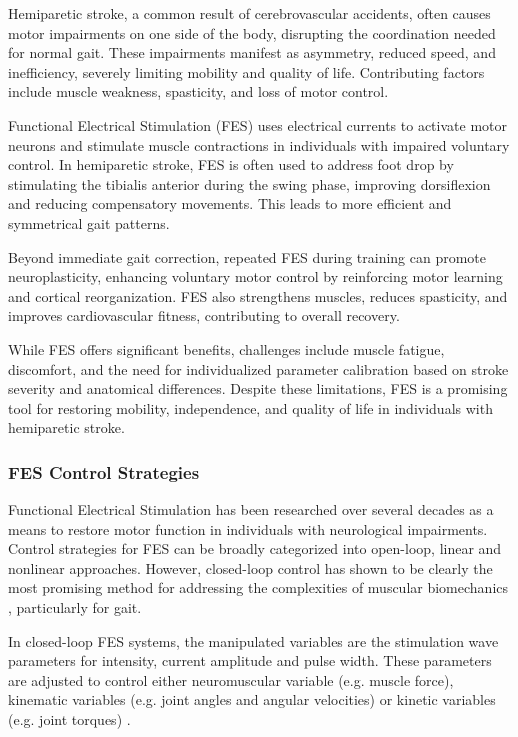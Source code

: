 Hemiparetic stroke, a common result of cerebrovascular accidents, often causes motor impairments on one side of the body, disrupting the coordination needed for normal gait. These impairments manifest as asymmetry, reduced speed, and inefficiency, severely limiting mobility and quality of life. Contributing factors include muscle weakness, spasticity, and loss of motor control.

Functional Electrical Stimulation (FES) uses electrical currents to activate motor neurons and stimulate muscle contractions in individuals with impaired voluntary control. In hemiparetic stroke, FES is often used to address foot drop by stimulating the tibialis anterior during the swing phase, improving dorsiflexion and reducing compensatory movements. This leads to more efficient and symmetrical gait patterns.

Beyond immediate gait correction, repeated FES during training can promote neuroplasticity, enhancing voluntary motor control by reinforcing motor learning and cortical reorganization. FES also strengthens muscles, reduces spasticity, and improves cardiovascular fitness, contributing to overall recovery.

While FES offers significant benefits, challenges include muscle fatigue, discomfort, and the need for individualized parameter calibration based on stroke severity and anatomical differences. Despite these limitations, FES is a promising tool for restoring mobility, independence, and quality of life in individuals with hemiparetic stroke.

\subsubsection*{FES Control Strategies}
Functional Electrical Stimulation has been researched over several decades as a means to restore motor function in individuals with neurological impairments. Control strategies for FES can be broadly categorized into open-loop, linear and nonlinear approaches. However, closed-loop control has shown to be clearly the most promising method for addressing the complexities of muscular biomechanics \cite{chaikho_transcutaneous_2022}, particularly for gait.

In closed-loop FES systems, the manipulated variables are the stimulation wave parameters for intensity, current amplitude and pulse width. These parameters are adjusted to control either neuromuscular variable (e.g. muscle force), kinematic variables (e.g. joint angles and angular velocities) or kinetic variables (e.g. joint torques) \cite{chaikho_transcutaneous_2022}.

